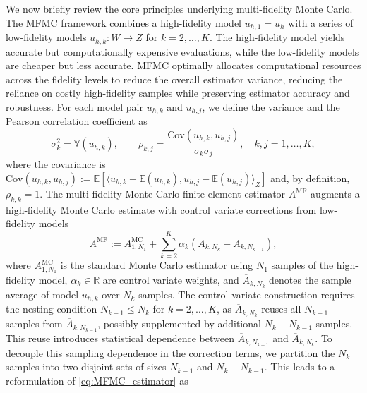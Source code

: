 

We now briefly review the core principles underlying multi-fidelity Monte Carlo. The MFMC framework combines a high-fidelity model $u_{h,1} = u_h$ with a series of low-fidelity models $u_{h,k}: W \rightarrow Z$ for $k=2,\ldots,K$.  The high-fidelity model yields accurate but computationally expensive evaluations, while the low-fidelity models are cheaper but less accurate. MFMC optimally allocates computational resources across the fidelity levels to reduce the overall estimator variance, reducing the reliance on costly high-fidelity samples while preserving estimator accuracy and robustness. For each model pair $u_{h,k}$ and $u_{h,j}$, we define the variance and the Pearson correlation coefficient as
%
\begin{equation*}
    \sigma_k^2 = \mathbb{V}\left(u_{h,k}\right),\qquad \rho_{k,j} = \frac{\text{Cov}\left( u_{h,k}, u_{h,j}\right)}{\sigma_k\sigma_j}, \quad k,j=1,\dots, K,
\end{equation*}
%
where the covariance is $\text{Cov}(u_{h,k}, u_{h,j}) := \mathbb{E}[\langle u_{h,k} - \mathbb{E}(u_{h,k}), u_{h,j} - \mathbb{E}(u_{h,j})\rangle_Z]$ and, by definition, $\rho_{k,k}=1$. The multi-fidelity Monte Carlo finite element estimator $A^{\text{MF}}$ augments a high-fidelity Monte Carlo estimate with control variate corrections from low-fidelity models
%
\begin{equation}\label{eq:MFMC_estimator}
    A^{\text{MF}} := A^{\text{MC}}_{1,N_1} + \sum_{k=2}^K \alpha_k\left(\overline{A}_{k,N_k} - \overline{A}_{k,N_{k-1}} \right),
\end{equation}
%
where $A^{\text{MC}}_{1,N_1}$ is the standard Monte Carlo estimator using $N_1$ samples of the high-fidelity model, $\alpha_k\in \mathbb{R}$ are control variate weights, and $\overline{A}_{k,N_k}$ denotes the sample average of model $u_{h,k}$ over $N_k$ samples. The control variate construction requires the nesting condition $N_{k-1}\le N_k$ for $k=2,\ldots, K$, as $\overline{A}_{k,N_{k}}$ reuses all $N_{k-1}$ samples from $\overline{A}_{k,N_{k-1}}$, possibly supplemented by additional $N_{k} - N_{k-1}$ samples. This reuse introduces statistical dependence between $\overline{A}_{k,N_{k-1}}$ and $\overline{A}_{k,N_{k}}$. To decouple this sampling dependence in the correction terms, we partition the $N_k$ samples into two disjoint sets of sizes  $N_{k-1}$ and $N_k - N_{k-1}$. This leads to a reformulation of \eqref{eq:MFMC_estimator} as
